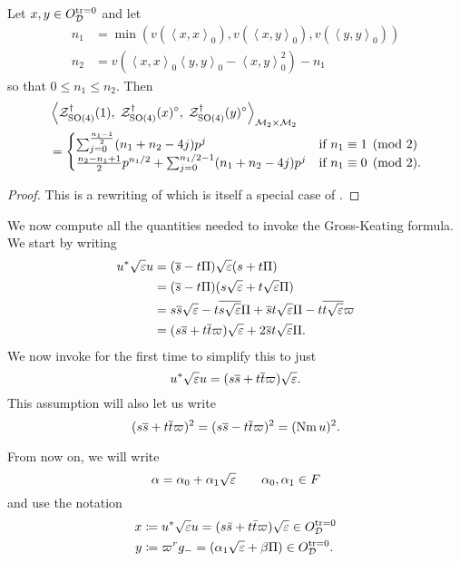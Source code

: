 \begin{proposition}
  \label{prop:GK}
  Let $x,y \in O_\mathcal D^{\operatorname{tr} = 0}$ and let
  \begin{align*}
    n_1 &= \min\left( v(\left\langle x,x \right\rangle _0), v(\left\langle x,y \right\rangle _0), v(\left\langle y,y \right\rangle _0) \right) \\
    n_2 &= v\left( \left\langle x,x \right\rangle _0 \left\langle y,y \right\rangle _0 - \left\langle x,y \right\rangle^2_0 \right) - n_1
  \end{align*}
  so that $0 \le n_1 \le n_2$.
  Then
  \begin{align*}
    &\left< \mathcal Z^{\dagger}_{\operatorname{SO}(4)}(1), \; \mathcal Z^{\dagger}_{\operatorname{SO}(4)}(x)^\circ, \; \mathcal Z^{\dagger}_{\operatorname{SO}(4)}(y)^\circ \right>_{\mathcal M_2 \times \mathcal M_2} \\
    &=
    \begin{cases}
      \sum_{j=0}^{\frac{n_1-1}{2}} (n_1+n_2-4j) p^j & \text{if } n_1 \equiv 1 \pmod 2 \\
      \frac{n_2-n_1+1}{2} p^{n_1/2} + \sum_{j=0}^{n_1/2-1} (n_1+n_2-4j) p^j & \text{if } n_1 \equiv 0 \pmod 2.
    \end{cases}
  \end{align*}
\end{proposition}
\begin{proof}
  This is a rewriting of \cite[Proposition 14.6]{ref:Kudla1997}
  which is itself a special case of \cite[Proposition 5.4]{ref:GK}.
\end{proof}

We now compute all the quantities needed to invoke the Gross-Keating formula.
We start by writing
\begin{align*}
  u^\ast \sqrt{\varepsilon} u
  &= (\overline s - t \Pi) \sqrt{\varepsilon} (s + t \Pi) \\
  &= (\overline s - t \Pi) (s \sqrt{\varepsilon} + t \sqrt{\varepsilon} \Pi) \\
  &= s \overline s \sqrt{\varepsilon} - t \overline{s\sqrt{\varepsilon}} \Pi + \overline s t \sqrt{\varepsilon} \Pi - t \overline{t \sqrt{\varepsilon}} \varpi \\
  &= (s \overline s + t \overline t \varpi) \sqrt{\varepsilon} + 2 \overline s t \sqrt{\varepsilon} \Pi.
\end{align*}
We now invoke  for the first time to simplify this to just
\[ u^\ast \sqrt{\varepsilon} u = (s \overline s + t \overline t \varpi) \sqrt{\varepsilon}. \]
This assumption will also let us write
\[ (s \overline s + t \overline t \varpi)^2 = (s \overline s - t \overline t \varpi)^2 = (\operatorname{Nm} u)^2. \]

From now on, we will write
\[ \alpha = \alpha_0 + \alpha_1 \sqrt{\varepsilon} \qquad \alpha_0, \alpha_1 \in F \]
and use the notation
\begin{align*}
  x &\coloneqq u^\ast \sqrt{\varepsilon} u = (s \bar s + t \bar t \varpi) \sqrt{\varepsilon} \in O_\mathcal D^{\operatorname{tr} = 0} \\
  y &\coloneqq \varpi^r g_- = (\alpha_1\sqrt{\varepsilon} + \beta \Pi) \in O_\mathcal D^{\operatorname{tr} = 0}.
\end{align*}

